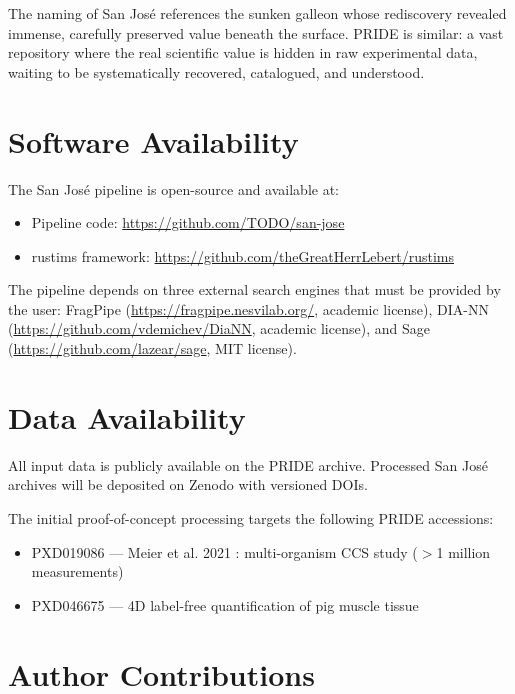 \documentclass[10pt,twoside]{article}
\begin{document}
The naming of San Jos\'{e} references the sunken galleon whose rediscovery revealed immense, carefully preserved value beneath the surface.
PRIDE is similar: a vast repository where the real scientific value is hidden in raw experimental data, waiting to be systematically recovered, catalogued, and understood.

\section{Software Availability}\label{sec:software_availability}

The San Jos\'{e} pipeline is open-source and available at:

\begin{itemize}
    \item Pipeline code: \url{https://github.com/TODO/san-jose}
    \item rustims framework: \url{https://github.com/theGreatHerrLebert/rustims}
\end{itemize}

The pipeline depends on three external search engines that must be provided by the user:
FragPipe (\url{https://fragpipe.nesvilab.org/}, academic license),
DIA-NN (\url{https://github.com/vdemichev/DiaNN}, academic license),
and Sage (\url{https://github.com/lazear/sage}, MIT license).

\section{Data Availability}\label{sec:data_availability}

All input data is publicly available on the PRIDE archive.
Processed San Jos\'{e} archives will be deposited on Zenodo with versioned DOIs.

The initial proof-of-concept processing targets the following PRIDE accessions:
\begin{itemize}
    \item PXD019086 --- Meier et al. 2021 \cite{meier_deep_2021}: multi-organism CCS study ($>$1 million measurements)
    \item PXD046675 --- 4D label-free quantification of pig muscle tissue
\end{itemize}

\section{Author Contributions}
\end{document}
